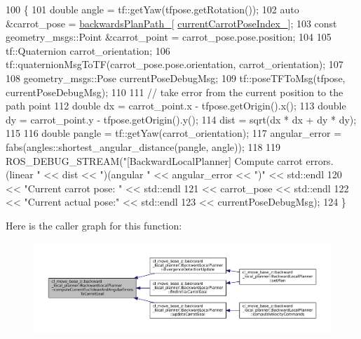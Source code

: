 \begin{DoxyCode}
100         \{
101             \textcolor{keywordtype}{double} angle = tf::getYaw(tfpose.getRotation());
102             \textcolor{keyword}{auto} &carrot\_pose = \hyperlink{classcl__move__base__z_1_1backward__local__planner_1_1BackwardLocalPlanner_ad9cde5c85f782cab2ddb4030e3c3f2cf}{backwardsPlanPath\_}[
      \hyperlink{classcl__move__base__z_1_1backward__local__planner_1_1BackwardLocalPlanner_a2e8f2b78bc97f27c5fa431f3af2261ed}{currentCarrotPoseIndex\_}];
103             \textcolor{keyword}{const} geometry\_msgs::Point &carrot\_point = carrot\_pose.pose.position;
104 
105             tf::Quaternion carrot\_orientation;
106             tf::quaternionMsgToTF(carrot\_pose.pose.orientation, carrot\_orientation);
107 
108             geometry\_msgs::Pose currentPoseDebugMsg;
109             tf::poseTFToMsg(tfpose, currentPoseDebugMsg);
110 
111             \textcolor{comment}{// take error from the current position to the path point}
112             \textcolor{keywordtype}{double} dx = carrot\_point.x - tfpose.getOrigin().x();
113             \textcolor{keywordtype}{double} dy = carrot\_point.y - tfpose.getOrigin().y();
114             dist = sqrt(dx * dx + dy * dy);
115 
116             \textcolor{keywordtype}{double} pangle = tf::getYaw(carrot\_orientation);
117             angular\_error = fabs(angles::shortest\_angular\_distance(pangle, angle));
118 
119             ROS\_DEBUG\_STREAM(\textcolor{stringliteral}{"[BackwardLocalPlanner] Compute carrot errors. (linear "} << dist << \textcolor{stringliteral}{")(angular
       "} << angular\_error << \textcolor{stringliteral}{")"} << std::endl
120                                                                                       << \textcolor{stringliteral}{"Current carrot
       pose: "} << std::endl
121                                                                                       << carrot\_pose << 
      std::endl
122                                                                                       << \textcolor{stringliteral}{"Current actual
       pose:"} << std::endl
123                                                                                       << 
      currentPoseDebugMsg);
124         \}
\end{DoxyCode}
Here is the caller graph for this function\+:
\nopagebreak
\begin{figure}[H]
\begin{center}
\leavevmode
\includegraphics[width=350pt]{classcl__move__base__z_1_1backward__local__planner_1_1BackwardLocalPlanner_ad39ba029c760fc63ea286c74b5b9b795_icgraph}
\end{center}
\end{figure}
